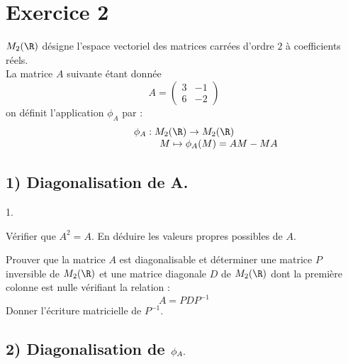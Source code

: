 \documentclass[11pt]{article}%
\begin{document}
\section*{Exercice 2}

$M_{2}(\R)$ désigne l'espace vectoriel des matrices carrées
d'ordre $2$ à coefficients réels.\\
La matrice $A$ suivante étant donnée 
\[
A = \left( 
\begin{array}{cc}
3 & -1 \\
6 & -2
\end{array}
\right) 
\]
on définit l'application $\phi_{A}$ par : 
\[
\left. 
\begin{array}{c}
\phi_{A} :M_{2}(\R)\rightarrow M_{2}(\R) \\
\qquad \quad \qquad \qquad M\mapsto \phi_{A}(M) = AM-MA
\end{array}
\right. 
\]

\subsection*{1) Diagonalisation de A.}

\begin{noliste}{1.}
 \setlength{\itemsep}{4mm}
\item Vérifier que $A^{2} = A.$ En déduire les valeurs propres
possibles
de $A$.

\item Prouver que la matrice $A$ est diagonalisable et déterminer une
matrice $P$ inversible de $M_{2}(\R)$ et une matrice diagonale $D$ de
$M_{2}(\R)$ dont la première colonne est nulle vérifiant la
relation : 
\[
A = PDP^{-1}
\]
Donner l'écriture matricielle de $P^{-1}.$
\end{noliste}

\subsection*{2) Diagonalisation de $\protect \phi_{A}.$}
\end{document}
